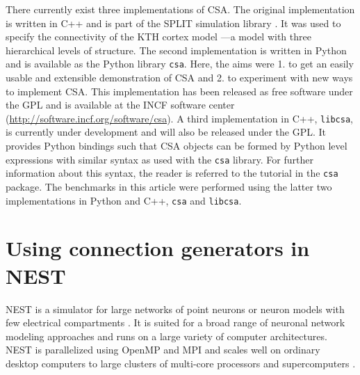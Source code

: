 \documentclass{frontiersSCNS} %
\begin{document}
There currently exist three implementations of CSA.  The original
implementation is written in C++ and is part of the SPLIT simulation
library \citep{djurfeldt05}.  It was used to specify the connectivity
of the KTH cortex model \citep{djurfeldt08}---a model with three
hierarchical levels of structure.  The second implementation is
written in Python and is available as the Python library \verb|csa|.
Here, the aims were 1. to get an easily usable and extensible
demonstration of CSA and 2. to experiment with new ways to implement
CSA. This implementation has been released as free software under the
GPL and is available at the INCF software center
(\url{http://software.incf.org/software/csa}). A third implementation
in C++, \verb|libcsa|, is currently under development and will also be
released under the GPL. It provides Python bindings such that CSA
objects can be formed by Python level expressions with similar syntax
as used with the \verb|csa| library. For further information about
this syntax, the reader is referred to the tutorial in the \verb|csa|
package. The benchmarks in this article were performed using the
latter two implementations in Python and C++, \verb|csa| and
\verb|libcsa|.




\section{Using connection generators in NEST}\label{sec:conn_gen_nest}

NEST is a simulator for large networks of point neurons or neuron
models with few electrical compartments
\citep[\url{http://www.nest-simulator.org};][]{Gewaltig_07_11204}. It
is suited for a broad range of neuronal network modeling approaches
and runs on a large variety of computer architectures. NEST is
parallelized using OpenMP \citep{OpenMPSpec} and MPI
\citep{MPIForum94} and scales well on ordinary desktop computers to
large clusters of multi-core processors and supercomputers
\citep{Helias12_26}.
\end{document}
